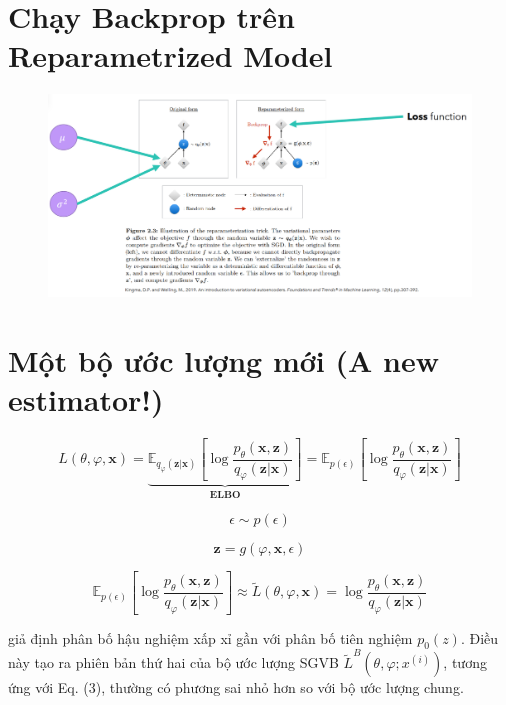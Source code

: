 \documentclass{book}
\begin{document}
\section{Chạy Backprop trên Reparametrized Model}
\begin{figure}[H]
    \centering
    \includegraphics[width=0.95\linewidth]{images/VAE_12.png}
\end{figure}

\section{Một bộ ước lượng mới (A new estimator!)}
\[
L(\theta, \varphi, \mathbf{x}) 
= \underbrace{\mathbb{E}_{q_{\varphi}(\mathbf{z}|\mathbf{x})} 
\left[ \log \frac{p_{\theta}(\mathbf{x}, \mathbf{z})}{q_{\varphi}(\mathbf{z}|\mathbf{x})} \right]}_{\textbf{ELBO}} 
= \mathbb{E}_{p(\epsilon)} 
\left[ \log \frac{p_{\theta}(\mathbf{x}, \mathbf{z})}{q_{\varphi}(\mathbf{z}|\mathbf{x})} \right]
\]

\[
\epsilon \sim p(\epsilon)
\]

\[
\mathbf{z} = g(\varphi, \mathbf{x}, \epsilon)
\]

\[
\mathbb{E}_{p(\epsilon)} 
\left[ \log \frac{p_{\theta}(\mathbf{x}, \mathbf{z})}{q_{\varphi}(\mathbf{z}|\mathbf{x})} \right] 
\approx \tilde{L}(\theta, \varphi, \mathbf{x}) 
= \log \frac{p_{\theta}(\mathbf{x}, \mathbf{z})}{q_{\varphi}(\mathbf{z}|\mathbf{x})}
\]

giả định phân bố hậu nghiệm xấp xỉ gần với phân bố tiên nghiệm $p_0(z)$. Điều này tạo ra phiên bản thứ hai của bộ ước lượng SGVB $\tilde{L}^B(\theta, \varphi; x^{(i)})$, tương ứng với Eq. (3), thường có phương sai nhỏ hơn so với bộ ước lượng chung.
\end{document}

